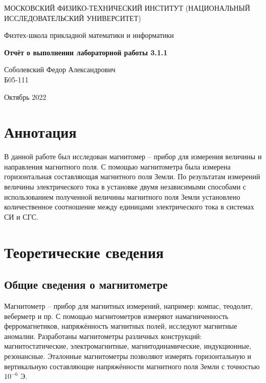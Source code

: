 \documentclass[a4paper,12pt]{article} %
\date{\today}
\begin{document}
\begin{titlepage}
	\begin{center}
		{\large МОСКОВСКИЙ ФИЗИКО-ТЕХНИЧЕСКИЙ ИНСТИТУТ (НАЦИОНАЛЬНЫЙ ИССЛЕДОВАТЕЛЬСКИЙ УНИВЕРСИТЕТ)}
	\end{center}
	\begin{center}
		{\large Физтех-школа прикладной математики и информатики}
	\end{center}
	
	
	\vspace{4.5cm}
	{\huge
		\begin{center}
			{\bf Отчёт о выполнении лабораторной работы 3.1.1}\\
			
		\end{center}
	}
	\vspace{1cm}
	\begin{center}
		{\large Соболевский Федор Александрович \\
			\vspace{0.2cm}
			Б05-111}
	\end{center}
	\vspace{8cm}
	\begin{center}
		Октябрь 2022
	\end{center}
\end{titlepage}

\section{Аннотация}

В данной работе был исследован магнитомер -- прибор для измерения величины и направления магнитного поля. С помощью магнитометра была измерена горизонтальная составляющая магнитного поля Земли. По результатам измерений величины электрического тока в установке двумя независимыми способами с использованием полученной величины магнитного поля Земли установлено количественное соотношение между единицами электрического тока в системах СИ и СГС.

\section{Теоретические сведения}

\subsection{Общие сведения о магнитометре}

Магнитометр -- прибор для магнитных измерений, например: компас, теодолит, веберметр и пр. С помощью магнитометров измеряют намагниченность ферромагнетиков, напряжённость магнитных полей, исследуют магнитные аномалии. Разработаны магнитометры различных конструкций: магнитостатические, электромагнитные, магнитодинамические, индукционные, резонансные. Эталонные магнитометры позволяют измерять горизонтальную и вертикальную составляющие напряжённости магнитного поля Земли с точностью $10^{-6}$ Э.
\end{document}

